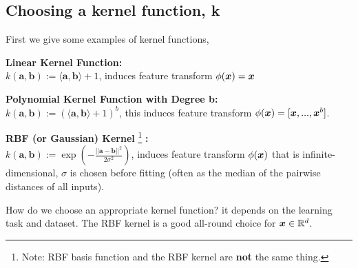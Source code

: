 \subsection{Choosing a kernel function, k}
First we give some examples of kernel functions,
\begin{definition}
    \textbf{Linear Kernel Function:} \\
    $k(\bm{a}, \bm{b}) := \langle \bm{a}, \bm{b} \rangle +1$, induces feature transform $\phi(\bm{x}) = \bm{x}$
\end{definition}
\begin{definition}
    \textbf{Polynomial Kernel Function with Degree b:} \\
    $k(\bm{a}, \bm{b}) := (\langle \bm{a} , \bm{b} \rangle +1)^{b}$, this induces feature transform $\phi(\bm{x}) = [\bm{x}, ..., \bm{x}^{b}]$.
\end{definition}
\begin{definition}
    \textbf{RBF (or Gaussian) Kernel} \footnote{Note: RBF basis function and the RBF kernel are \textbf{not} the same thing.} \textbf{:} \\
    $k(\bm{a}, \bm{b}) := \exp(- \frac{|| \bm{a} - \bm{b} ||^{2}}{2 \sigma^{2}})$, induces feature transform $\phi(\bm{x})$ that is infinite-dimensional, $\sigma$ is chosen before fitting (often as the median of the pairwise distances of all inputs).
\end{definition}
How do we choose an appropriate kernel function? it depends on the learning task and dataset. The RBF kernel is a good all-round choice for $\bm{x} \in \mathbb{R}^{d}$.